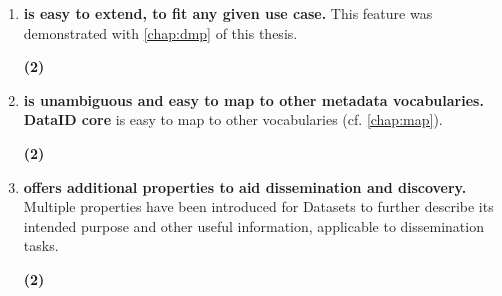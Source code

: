 \documentclass[a4paper,english,twoside,BCOR1.5cm,headsepline,DIV12,appendixprefix,final,12pt]{scrbook}
\newcommand{\core}{{\ttfamily\bfseries DataID core}\xspace}
\newcommand{\prov}{{\scshape\bfseries prov-o}\xspace}
\begin{document}
\begin{enumerate}[A]
In addition to the natural qualifying mechanisms of \prov, \core provides for further qualifications for related Agents and Datasets. 
\begin{flushright}\color{ForestGreen}\textbf{(2)}\end{flushright}
\item \textbf{is easy to extend, to fit any given use case.}
This feature was demonstrated with \cref{chap:dmp} of this thesis.
\begin{flushright}\color{ForestGreen}\textbf{(2)}\end{flushright}
\item \textbf{is unambiguous and easy to map to other metadata vocabularies.}
\core is easy to map to other vocabularies (cf. \cref{chap:map}).
\begin{flushright}\color{ForestGreen}\textbf{(2)}\end{flushright}
\item \textbf{offers additional properties to aid dissemination and discovery.}
Multiple properties have been introduced for Datasets to further describe its intended purpose and other useful information, applicable to dissemination tasks.
\begin{flushright}\color{ForestGreen}\textbf{(2)}\end{flushright}
\end{enumerate}
\end{document}
